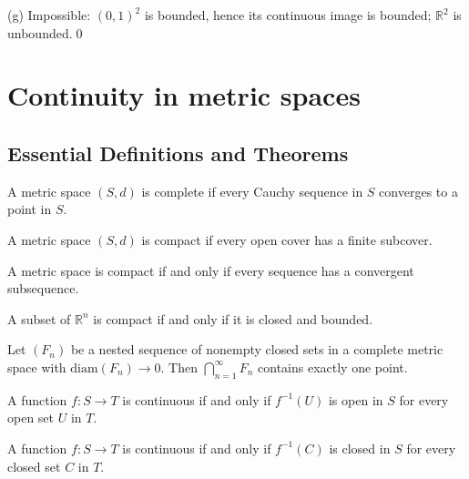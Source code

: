 (g) Impossible: $(0,1)^2$ is bounded, hence its continuous image is bounded; $\mathbb{R}^2$ is unbounded.\qed

\section{Continuity in metric spaces}

\subsection*{Essential Definitions and Theorems}

\begin{definition}
A metric space $(S,d)$ is complete if every Cauchy sequence in $S$ converges to a point in $S$.
\end{definition}

\begin{definition}
A metric space $(S,d)$ is compact if every open cover has a finite subcover.
\end{definition}

\begin{theorem}
A metric space is compact if and only if every sequence has a convergent subsequence.
\end{theorem}

\begin{theorem}
A subset of $\mathbb{R}^n$ is compact if and only if it is closed and bounded.
\end{theorem}

\begin{theorem}
Let $(F_n)$ be a nested sequence of nonempty closed sets in a complete metric space with $\text{diam}(F_n) \to 0$. Then $\bigcap_{n=1}^{\infty} F_n$ contains exactly one point.
\end{theorem}

\begin{theorem}
A function $f: S \to T$ is continuous if and only if $f^{-1}(U)$ is open in $S$ for every open set $U$ in $T$.
\end{theorem}

\begin{theorem}
A function $f: S \to T$ is continuous if and only if $f^{-1}(C)$ is closed in $S$ for every closed set $C$ in $T$.
\end{theorem}

